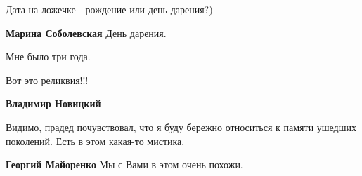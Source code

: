  
 
 
 
 

Дата на ложечке - рождение или день дарения?)

\textbf{Марина Соболевская} День дарения.

Мне было три года.

Вот это реликвия!!!

\textbf{Владимир Новицкий} 

Видимо, прадед почувствовал, что я буду бережно относиться к памяти ушедших
поколений. Есть в этом какая-то мистика.

\textbf{Георгий Майоренко} Мы с Вами в этом очень похожи.

